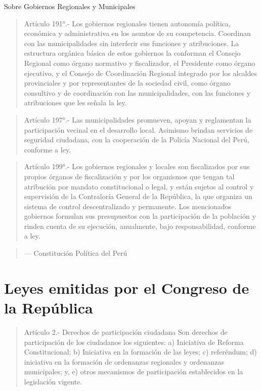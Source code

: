 \documentclass[
]{book}
\begin{document}
Sobre Gobiernos Regionales y Municipales

\begin{quote}
Artículo 191°.- Los gobiernos regionales tienen autonomía política, económica y
administrativa en los asuntos de su competencia. Coordinan con las
municipalidades sin interferir sus funciones y atribuciones.
La estructura orgánica básica de estos gobiernos la conforman el Consejo
Regional como órgano normativo y fiscalizador, el Presidente como órgano
ejecutivo, y el Consejo de Coordinación Regional integrado por los alcaldes
provinciales y por representantes de la sociedad civil, como órgano consultivo y
de coordinación con las municipalidades, con las funciones y atribuciones que les
señala la ley.
\end{quote}

\begin{quote}
Artículo 197°.- Las municipalidades promueven, apoyan y reglamentan la
participación vecinal en el desarrollo local. Asimismo brindan servicios de
seguridad ciudadana, con la cooperación de la Policía Nacional del Perú,
conforme a ley.
\end{quote}

\begin{quote}
Artículo 199°.- Los gobiernos regionales y locales son fiscalizados por sus
propios órganos de fiscalización y por los organismos que tengan tal atribución
por mandato constitucional o legal, y están sujetos al control y supervisión de la
Contraloría General de la República, la que organiza un sistema de control
descentralizado y permanente. Los mencionados gobiernos formulan sus
presupuestos con la participación de la población y rinden cuenta de su ejecución,
anualmente, bajo responsabilidad, conforme a ley.
\end{quote}

\begin{quote}
--- Constitución Política del Perú
\end{quote}

\hypertarget{leyes-emitidas-por-el-congreso-de-la-repuxfablica}{%
\section{Leyes emitidas por el Congreso de la República}\label{leyes-emitidas-por-el-congreso-de-la-repuxfablica}}

\begin{quote}
Artículo 2.- Derechos de participación ciudadana
Son derechos de participación de los ciudadanos los siguientes:
a) Iniciativa de Reforma Constitucional;
b) Iniciativa en la formación de las leyes;
c) referéndum;
d) iniciativa en la formación de ordenanzas regionales y ordenanzas municipales; y,
e) otros mecanismos de participación establecidos en la legislación vigente.
\end{quote}
\end{document}
